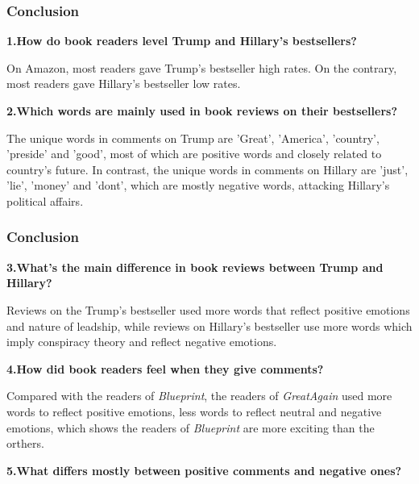 \documentclass[9pt]{beamer}
\begin{document}
\begin{frame}
\frametitle{Conclusion}
\large{\textbf{1.How do book readers level Trump and Hillary's bestsellers?}}

On Amazon, most readers gave Trump's bestseller high rates. On the contrary, most readers gave Hillary's bestseller low rates.

\large{\textbf{2.Which words are mainly used in book reviews on their bestsellers?}}

The unique words in comments on Trump are ’Great’, ’America’, ’country’, ’preside’ and ’good’, most of which are positive words and closely related to country's future. In contrast, the unique words in comments on Hillary are ’just’, ’lie’, ’money’ and ’dont’,
which are mostly negative words, attacking Hillary’s political affairs.
\end{frame}

\begin{frame}
\frametitle{Conclusion}
\large{\textbf{3.What's the main difference in book reviews between Trump and Hillary?}}

Reviews on the Trump's bestseller used more words that reflect positive emotions and nature of leadship, while reviews on Hillary's bestseller use more words which imply conspiracy theory and reflect negative emotions.

\large{\textbf{4.How did book readers feel when they give comments?}}

Compared with the readers of \textit{Blueprint}, the readers of \textit{GreatAgain} used more words to reflect positive emotions, less words to reflect neutral and negative emotions, which shows the readers of \textit{Blueprint} are more exciting than the orthers.

\large{\textbf{5.What differs mostly between positive comments and negative ones?}}
\end{frame}
\end{document}
